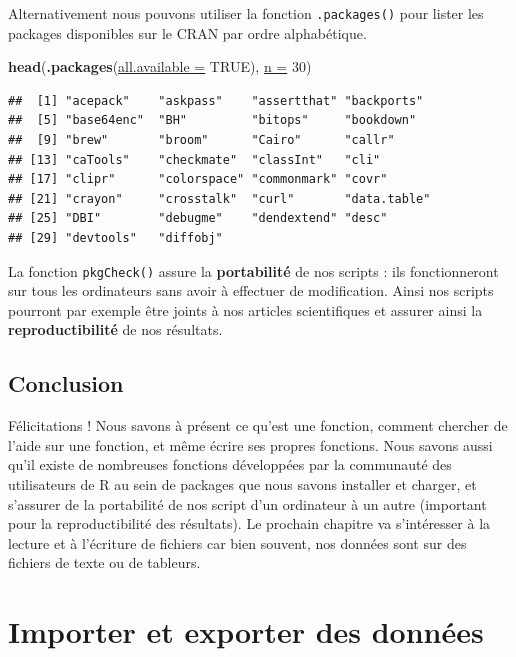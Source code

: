 \documentclass[twoside,symmetric]{book}
\newenvironment{Shaded}{}{}
\newcommand{\DataTypeTok}[1]{\underline{#1}}
\newcommand{\DecValTok}[1]{#1}
\newcommand{\KeywordTok}[1]{\textbf{#1}}
\newcommand{\NormalTok}[1]{#1}
\newcommand{\OtherTok}[1]{#1}
\begin{document}
Alternativement nous pouvons utiliser la fonction \texttt{.packages()} pour lister les packages disponibles sur le CRAN par ordre alphabétique.

\begin{Shaded}
\begin{Highlighting}[]
\KeywordTok{head}\NormalTok{(}\KeywordTok{.packages}\NormalTok{(}\DataTypeTok{all.available =} \OtherTok{TRUE}\NormalTok{), }\DataTypeTok{n =} \DecValTok{30}\NormalTok{)}
\end{Highlighting}
\end{Shaded}

\begin{verbatim}
##  [1] "acepack"    "askpass"    "assertthat" "backports" 
##  [5] "base64enc"  "BH"         "bitops"     "bookdown"  
##  [9] "brew"       "broom"      "Cairo"      "callr"     
## [13] "caTools"    "checkmate"  "classInt"   "cli"       
## [17] "clipr"      "colorspace" "commonmark" "covr"      
## [21] "crayon"     "crosstalk"  "curl"       "data.table"
## [25] "DBI"        "debugme"    "dendextend" "desc"      
## [29] "devtools"   "diffobj"
\end{verbatim}

La fonction \texttt{pkgCheck()} assure la \textbf{portabilité} de nos scripts : ils fonctionneront sur tous les ordinateurs sans avoir à effectuer de modification. Ainsi nos scripts pourront par exemple être joints à nos articles scientifiques et assurer ainsi la \textbf{reproductibilité} de nos résultats.

\hypertarget{conclusion-4}{%
\section{Conclusion}\label{conclusion-4}}

Félicitations ! Nous savons à présent ce qu'est une fonction, comment chercher de l'aide sur une fonction, et même écrire ses propres fonctions. Nous savons aussi qu'il existe de nombreuses fonctions développées par la communauté des utilisateurs de R au sein de packages que nous savons installer et charger, et s'assurer de la portabilité de nos script d'un ordinateur à un autre (important pour la reproductibilité des résultats). Le prochain chapitre va s'intéresser à la lecture et à l'écriture de fichiers car bien souvent, nos données sont sur des fichiers de texte ou de tableurs.

\hypertarget{import}{%
\chapter{Importer et exporter des données}\label{import}}
\end{document}
